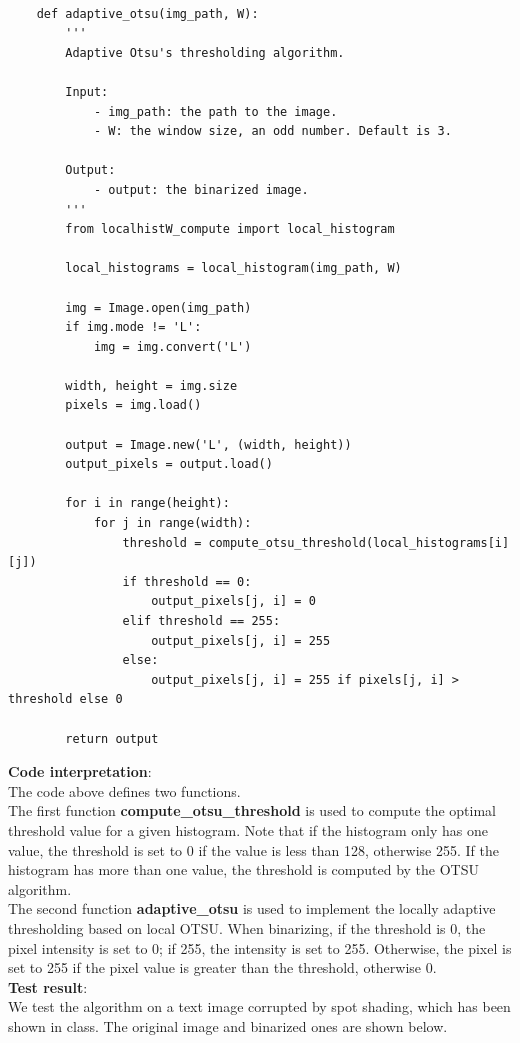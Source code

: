 \documentclass[UTF8]{ctexart}
\begin{document}
\begin{lstlisting}
    
    def adaptive_otsu(img_path, W):
        '''
        Adaptive Otsu's thresholding algorithm.
        
        Input:
            - img_path: the path to the image.
            - W: the window size, an odd number. Default is 3.
            
        Output:
            - output: the binarized image.
        '''
        from localhistW_compute import local_histogram
    
        local_histograms = local_histogram(img_path, W)
        
        img = Image.open(img_path)
        if img.mode != 'L':
            img = img.convert('L')
    
        width, height = img.size
        pixels = img.load()
    
        output = Image.new('L', (width, height))
        output_pixels = output.load()
    
        for i in range(height):
            for j in range(width):
                threshold = compute_otsu_threshold(local_histograms[i][j])
                if threshold == 0:
                    output_pixels[j, i] = 0
                elif threshold == 255:
                    output_pixels[j, i] = 255
                else:
                    output_pixels[j, i] = 255 if pixels[j, i] > threshold else 0
    
        return output
\end{lstlisting}
\textbf{Code interpretation}:\\
The code above defines two functions.\\
The first function \textbf{compute\_otsu\_threshold} is used to compute the optimal threshold value for a given histogram. Note that if
the histogram only has one value, the threshold is set to 0 if the value is less than 128, otherwise 255. If the histogram has more than one value, the threshold is computed by the OTSU algorithm.\\
The second function \textbf{adaptive\_otsu} is used to implement the locally adaptive thresholding based on local OTSU. 
When binarizing, if the threshold is 0, the pixel intensity is set to 0; if 255, the intensity is set to 255. Otherwise, the pixel is set to 255 if the pixel value is greater than the threshold, otherwise 0.\\
\textbf{Test result}:\\
We test the algorithm on a text image corrupted by spot shading, which has been shown in class. The original image and binarized ones are shown below.\\
\end{document}
